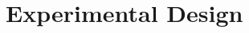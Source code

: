 \documentclass[11pt,a4paper,oneside]{article}
\begin{document}








\section{Experimental Design}
\end{document}

